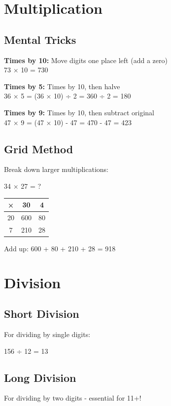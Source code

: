 \documentclass[a4paper,11pt]{article}
\begin{document}
\section{Multiplication}

\subsection{Mental Tricks}
\begin{tcolorbox}[colback=orange!5!white,colframe=orange!75!black,title=\textbf{Multiplication Shortcuts}]
\textbf{Times by 10:} Move digits one place left (add a zero)
\\73 × 10 = 730

\textbf{Times by 5:} Times by 10, then halve
\\36 × 5 = (36 × 10) ÷ 2 = 360 ÷ 2 = 180

\textbf{Times by 9:} Times by 10, then subtract original
\\47 × 9 = (47 × 10) - 47 = 470 - 47 = 423
\end{tcolorbox}

\subsection{Grid Method}
Break down larger multiplications:

\begin{center}
34 × 27 = ?

\begin{tabular}{|c|c|c|}
\hline
× & 30 & 4 \\
\hline
20 & 600 & 80 \\
\hline
7 & 210 & 28 \\
\hline
\end{tabular}

Add up: 600 + 80 + 210 + 28 = 918
\end{center}

\section{Division}

\subsection{Short Division}
For dividing by single digits:
\begin{center}
156 ÷ 12 = 13
\end{center}

\subsection{Long Division}
For dividing by two digits - essential for 11+!
\end{document}
